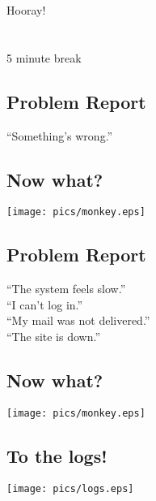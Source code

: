 \documentclass[xga]{xdvislides}
\begin{document}
\newpage
\vspace*{\fill}
\begin{center}
	\Hugesize
		Hooray!\\ [1em]
	\hspace*{5mm}
	\blueline\\
	\hspace*{5mm}\\
		5 minute break
\end{center}
\vspace*{\fill}

\subsection{Problem Report}
\vspace*{\fill}
\Huge
\begin{center}
``Something's wrong.''
\end{center}
\Normalsize
\vspace*{\fill}

\subsection{Now what?}
\begin{center}
	\texttt{[image: pics/monkey.eps]}
\end{center}

\subsection{Problem Report}
\vspace*{\fill}
\Huge
\begin{center}
``The system feels slow.'' \\
\addvspace{.5in}
``I can't log in.'' \\
\addvspace{.5in}
``My mail was not delivered.'' \\
\addvspace{.5in}
``The site is down.''
\end{center}
\Normalsize
\vspace*{\fill}

\subsection{Now what?}
\begin{center}
	\texttt{[image: pics/monkey.eps]}
\end{center}

\subsection{To the logs!}
\begin{center}
	\texttt{[image: pics/logs.eps]}
\end{center}
\end{document}
